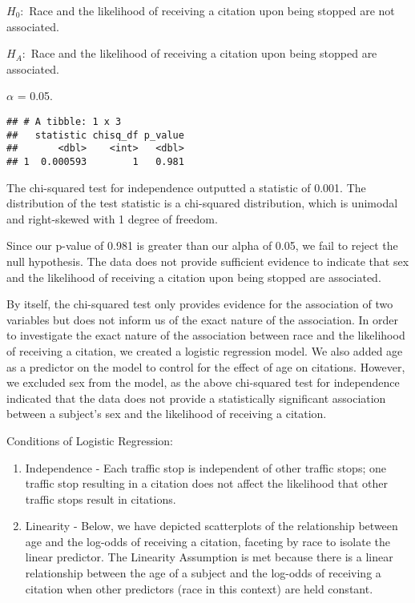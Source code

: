 \documentclass[
]{article}
\begin{document}
\(H_0:\) Race and the likelihood of receiving a citation upon being
stopped are not associated.

\(H_A:\) Race and the likelihood of receiving a citation upon being
stopped are associated.

\(\alpha\) = 0.05.

\begin{verbatim}
## # A tibble: 1 x 3
##   statistic chisq_df p_value
##       <dbl>    <int>   <dbl>
## 1  0.000593        1   0.981
\end{verbatim}

The chi-squared test for independence outputted a statistic of 0.001.
The distribution of the test statistic is a chi-squared distribution,
which is unimodal and right-skewed with 1 degree of freedom.

Since our p-value of 0.981 is greater than our alpha of 0.05, we fail to
reject the null hypothesis. The data does not provide sufficient
evidence to indicate that sex and the likelihood of receiving a citation
upon being stopped are associated.

By itself, the chi-squared test only provides evidence for the
association of two variables but does not inform us of the exact nature
of the association. In order to investigate the exact nature of the
association between race and the likelihood of receiving a citation, we
created a logistic regression model. We also added age as a predictor on
the model to control for the effect of age on citations. However, we
excluded sex from the model, as the above chi-squared test for
independence indicated that the data does not provide a statistically
significant association between a subject's sex and the likelihood of
receiving a citation.

Conditions of Logistic Regression:

\begin{enumerate}
\def\labelenumi{\arabic{enumi}.}
\item
  Independence - Each traffic stop is independent of other traffic
  stops; one traffic stop resulting in a citation does not affect the
  likelihood that other traffic stops result in citations.
\item
  Linearity - Below, we have depicted scatterplots of the relationship
  between age and the log-odds of receiving a citation, faceting by race
  to isolate the linear predictor. The Linearity Assumption is met
  because there is a linear relationship between the age of a subject
  and the log-odds of receiving a citation when other predictors (race
  in this context) are held constant.
\end{enumerate}
\end{document}
